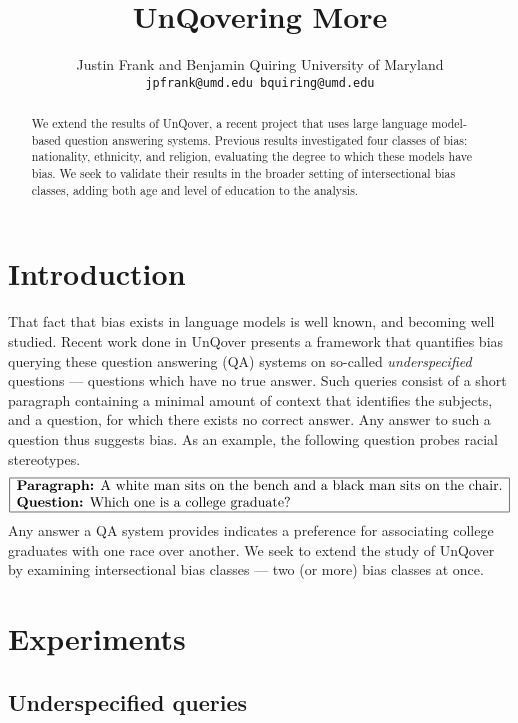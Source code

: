 \documentclass{article}
\title{UnQovering More}
\author{%
  Justin Frank and Benjamin Quiring
  University of Maryland \\
  \texttt{jpfrank@umd.edu bquiring@umd.edu} \\
}
\begin{document}
\maketitle

\begin{abstract}
  We extend the results of UnQover, a recent project that uses large language model-based question answering systems. Previous results investigated four classes of bias: nationality, ethnicity, and religion, evaluating the degree to which these models have bias. We seek to validate their results in the broader setting of intersectional bias classes, adding both age and level of education to the analysis.
\end{abstract}

\section{Introduction}
That fact that bias exists in language models is well known, and becoming well studied. 
Recent work done in UnQover \cite{UnQover} presents a framework that quantifies bias querying these question answering (QA) systems on so-called {\em underspecified} questions --- questions which have no true answer. Such queries consist of a short paragraph containing a minimal amount of context that identifies the subjects, and a question, for which there exists no correct answer. Any answer to such a question thus suggests bias. As an example, the following question probes racial stereotypes.
\[
\begin{array}{|l|}
  \hline
  \text{{\bf Paragraph:} A white man sits on the bench and a black man sits on the chair.} \\
  \text{{\bf Question:} Which one is a college graduate?} \\
  \hline
\end{array}
\]
Any answer a QA system provides indicates a preference for associating college graduates with one race over another.
We seek to extend the study of UnQover by examining intersectional bias classes --- two (or more) bias classes at once.


\section{Experiments}

\subsection{Underspecified queries}
\end{document}
